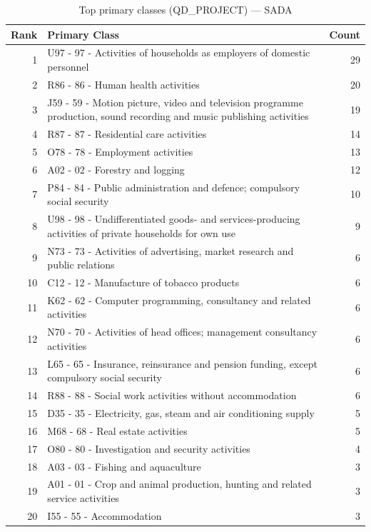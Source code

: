 \begin{table}[H]
    \centering
    \begin{tabular}{r p{10cm} r}
    \hline
    \textbf{Rank} & \textbf{Primary Class} & \textbf{Count} \\
    \hline
    1 & U97 - 97 - Activities of households as employers of domestic personnel & 29 \\
    2 & R86 - 86 - Human health activities & 20 \\
    3 & J59 - 59 - Motion picture, video and television programme production, sound recording and music publishing activities & 19 \\
    4 & R87 - 87 - Residential care activities & 14 \\
    5 & O78 - 78 - Employment activities & 13 \\
    6 & A02 - 02 - Forestry and logging & 12 \\
    7 & P84 - 84 - Public administration and defence; compulsory social security & 10 \\
    8 & U98 - 98 - Undifferentiated goods- and services-producing activities of private households for own use & 9 \\
    9 & N73 - 73 - Activities of advertising, market research and public relations & 6 \\
    10 & C12 - 12 - Manufacture of tobacco products & 6 \\
    11 & K62 - 62 - Computer programming, consultancy and related activities & 6 \\
    12 & N70 - 70 - Activities of head offices; management consultancy activities & 6 \\
    13 & L65 - 65 - Insurance, reinsurance and pension funding, except compulsory social security & 6 \\
    14 & R88 - 88 - Social work activities without accommodation & 6 \\
    15 & D35 - 35 - Electricity, gas, steam and air conditioning supply & 5 \\
    16 & M68 - 68 - Real estate activities & 5 \\
    17 & O80 - 80 - Investigation and security activities & 4 \\
    18 & A03 - 03 - Fishing and aquaculture & 3 \\
    19 & A01 - 01 - Crop and animal production, hunting and related service activities & 3 \\
    20 & I55 - 55 - Accommodation & 3 \\
    \hline
    \end{tabular}
    \caption{Top primary classes (QD\_PROJECT) --- SADA}
\end{table}

